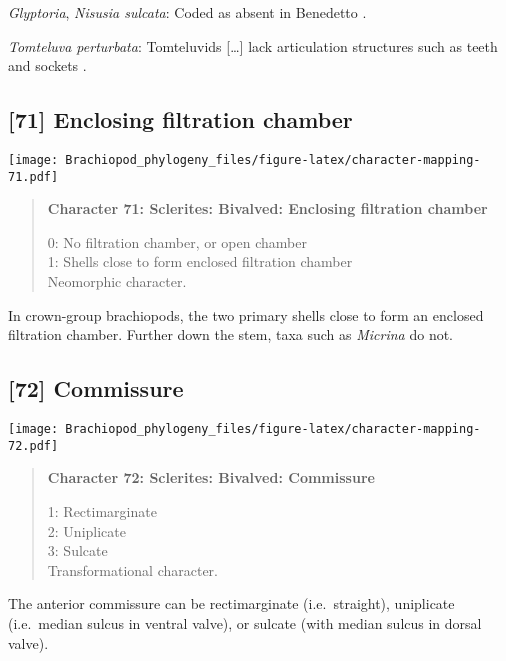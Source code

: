 \documentclass[openany]{book}
\theoremstyle{definition}
\theoremstyle{definition}
\theoremstyle{definition}
\theoremstyle{remark}
\begin{document}
\hypertarget{Glyptoria-coding-70}{}
\emph{Glyptoria}, \emph{Nisusia sulcata}: Coded as absent in Benedetto
\citeyearpar{Benedetto2009iChaniella}.

\hypertarget{Tomteluva_perturbata-coding-70}{}
\emph{Tomteluva perturbata}: Tomteluvids {[}\ldots{}{]} lack
articulation structures such as teeth and sockets
\citep{Streng2016Anew}.

\subsection*{{[}71{]} Enclosing filtration
chamber}\label{enclosing-filtration-chamber}

\texttt{[image: Brachiopod\_phylogeny\_files/figure-latex/character-mapping-71.pdf]}

\begin{quote}
\textbf{Character 71: Sclerites: Bivalved: Enclosing filtration chamber}

0: No filtration chamber, or open chamber\\
1: Shells close to form enclosed filtration chamber\\
Neomorphic character.
\end{quote}

In crown-group brachiopods, the two primary shells close to form an
enclosed filtration chamber. Further down the stem, taxa such as
\emph{Micrina} do not.

\subsection*{{[}72{]} Commissure}\label{commissure}

\texttt{[image: Brachiopod\_phylogeny\_files/figure-latex/character-mapping-72.pdf]}

\begin{quote}
\textbf{Character 72: Sclerites: Bivalved: Commissure}

1: Rectimarginate\\
2: Uniplicate\\
3: Sulcate\\
Transformational character.
\end{quote}

The anterior commissure can be rectimarginate (i.e.~straight),
uniplicate (i.e.~median sulcus in ventral valve), or sulcate (with
median sulcus in dorsal valve).
\end{document}
